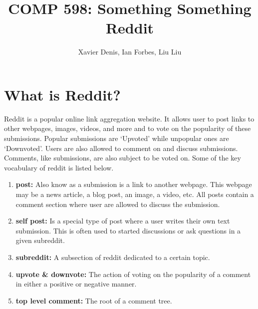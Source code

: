 \documentclass[10pt,twocolumn]{article}
\title {COMP 598: Something Something Reddit}
\author {Xavier Denis, Ian Forbes, Liu Liu}
\begin{document}
\section{What is Reddit?}

Reddit is a popular online link aggregation website. It allows user to post links to other webpages, images, videos, and more and to vote on the popularity of these submissions. Popular submissions are `Upvoted' while unpopular ones are `Downvoted'. Users are also allowed to comment on and discuss submissions. Comments, like submissions, are also subject to be voted on. Some of the key vocabulary of reddit is listed below.

\begin {enumerate}
\item \textbf{post:} Also know as a submission is a link to another webpage. This webpage may be a news article, a blog post, an image, a video, etc. All posts contain a comment section where user are allowed to discuss the submission.
\item \textbf{self post:} Is a special type of post where a user writes their own text submission. This is often used to started discussions or ask questions in a given subreddit. 
\item \textbf{subreddit:} A subsection of reddit dedicated to a certain topic. 
\item \textbf{upvote \& downvote:} The action of voting on the popularity of a comment in either a positive or negative manner.
\item \textbf{top level comment:} The root of a comment tree.
\end {enumerate}
\end{document}

